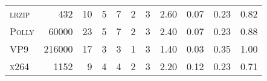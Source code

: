\begin{tabular}{lrrrrrrrrrr}
            \textsc{lrzip} &              432 &                                    10 &                5 &                                         7 &                         2 &                         3 &                                  2.60 &            0.07 &                        0.23 &                              0.82 \\
            \textsc{Polly} &            60000 &                                    23 &                5 &                                         7 &                         2 &                         3 &                                  2.40 &            0.07 &                        0.23 &                              0.88 \\
              \textsc{VP9} &           216000 &                                    17 &                3 &                                         3 &                         1 &                         3 &                                  1.40 &            0.03 &                        0.35 &                              1.00 \\
             \textsc{x264} &             1152 &                                     9 &                4 &                                         4 &                         2 &                         3 &                                  2.20 &            0.12 &                        0.23 &                              0.71 \\
\bottomrule
\end{tabular}
